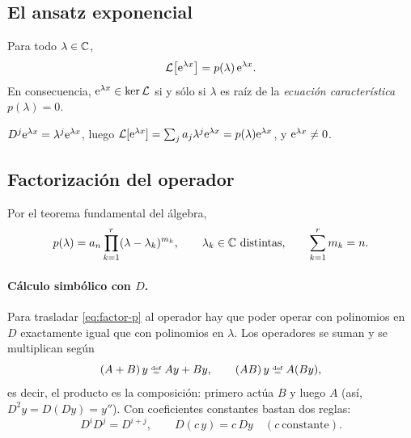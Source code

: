 \documentclass[11pt,twoside]{article}
\newcommand\Lop{\mathcal L}
\begin{document}
\subsection{El ansatz exponencial}

\begin{proposicion}\label{prop:autofuncion}
Para todo $\lambda\in\mathbb{C}$,
\begin{equation}\label{eq:autofuncion}
\Lop\big[\e^{\lambda x}\big]=p(\lambda)\,\e^{\lambda x}.
\end{equation}
En consecuencia, $\e^{\lambda x}\in\ker\Lop$ si y sólo si $\lambda$ es raíz de la \emph{ecuación característica} $p(\lambda)=0$.
\end{proposicion}

\begin{demostracion}
$D^j\mathrm{e}^{\lambda x}=\lambda^j\mathrm{e}^{\lambda x}$, luego $\Lop[\e^{\lambda x}]=\sum_ja_j\lambda^j\e^{\lambda x}=p(\lambda)\e^{\lambda x}$, y $\mathrm{e}^{\lambda x}\neq0$.
\end{demostracion}

\subsection{Factorización del operador}

Por el teorema fundamental del álgebra,
\begin{equation}\label{eq:factor-p}
p(\lambda)=a_n\prod_{k=1}^{r}(\lambda-\lambda_k)^{m_k},\qquad\lambda_k\in\C\ \text{distintas},\qquad\sum_{k=1}^{r}m_k=n.
\end{equation}

\paragraph{Cálculo simbólico con $D$.} Para trasladar \eqref{eq:factor-p} al operador hay que poder operar con polinomios
en $D$ exactamente igual que con polinomios en $\lambda$. Los operadores se suman y se multiplican según
\begin{equation}\label{eq:opalg}
(A+B)\,y\defeq Ay+By,\qquad(AB)\,y\defeq A(By),
\end{equation}
es decir, el producto es la composición: primero actúa $B$ y luego $A$ (así, $D^2y=D(Dy)=y''$). Con coeficientes
constantes bastan dos reglas:
\begin{equation}\label{eq:reglas}
D^iD^j=D^{i+j},\qquad D(c\,y)=c\,Dy\quad(c\ \text{constante}).
\end{equation}
\end{document}
